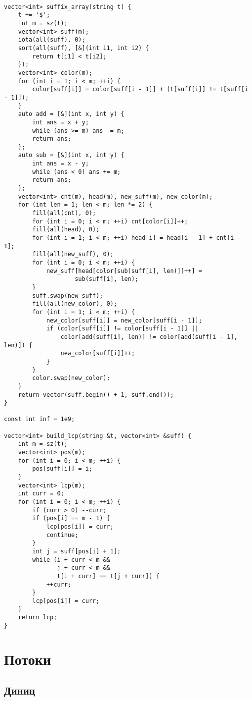 \documentclass{article}
\begin{document}
    \begin{verbatim}

vector<int> suffix_array(string t) {
    t += '$';
    int m = sz(t);
    vector<int> suff(m);
    iota(all(suff), 0);
    sort(all(suff), [&](int i1, int i2) {
        return t[i1] < t[i2];
    });
    vector<int> color(m);
    for (int i = 1; i < m; ++i) {
        color[suff[i]] = color[suff[i - 1]] + (t[suff[i]] != t[suff[i - 1]]);
    }
    auto add = [&](int x, int y) {
        int ans = x + y;
        while (ans >= m) ans -= m;
        return ans;
    };
    auto sub = [&](int x, int y) {
        int ans = x - y;
        while (ans < 0) ans += m;
        return ans;
    };
    vector<int> cnt(m), head(m), new_suff(m), new_color(m);
    for (int len = 1; len < m; len *= 2) {
        fill(all(cnt), 0);
        for (int i = 0; i < m; ++i) cnt[color[i]]++;
        fill(all(head), 0);
        for (int i = 1; i < m; ++i) head[i] = head[i - 1] + cnt[i - 1];
        fill(all(new_suff), 0);
        for (int i = 0; i < m; ++i) {
            new_suff[head[color[sub(suff[i], len)]]++] =
                    sub(suff[i], len);
        }
        suff.swap(new_suff);
        fill(all(new_color), 0);
        for (int i = 1; i < m; ++i) {
            new_color[suff[i]] = new_color[suff[i - 1]];
            if (color[suff[i]] != color[suff[i - 1]] ||
                color[add(suff[i], len)] != color[add(suff[i - 1], len)]) {
                new_color[suff[i]]++;
            }
        }
        color.swap(new_color);
    }
    return vector(suff.begin() + 1, suff.end());
}

const int inf = 1e9;

vector<int> build_lcp(string &t, vector<int> &suff) {
    int m = sz(t);
    vector<int> pos(m);
    for (int i = 0; i < m; ++i) {
        pos[suff[i]] = i;
    }
    vector<int> lcp(m);
    int curr = 0;
    for (int i = 0; i < m; ++i) {
        if (curr > 0) --curr;
        if (pos[i] == m - 1) {
            lcp[pos[i]] = curr;
            continue;
        }
        int j = suff[pos[i] + 1];
        while (i + curr < m &&
               j + curr < m &&
               t[i + curr] == t[j + curr]) {
            ++curr;
        }
        lcp[pos[i]] = curr;
    }
    return lcp;
}
    \end{verbatim}

    \section*{Потоки}

    \subsection{Диниц}
\end{document}
